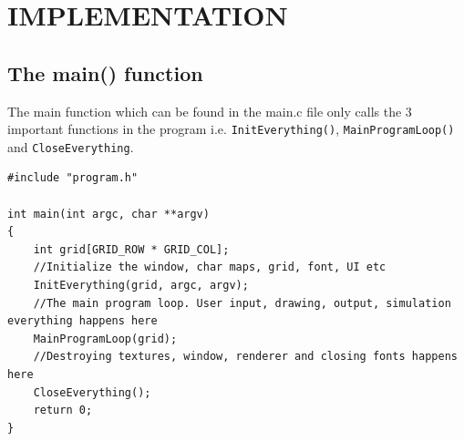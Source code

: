 \documentclass[report]{subfiles}
\begin{document}
    \chapter{IMPLEMENTATION}
    \section {The main() function}
    The main function which can be found in the main.c file only calls the 3 important functions in the program i.e. \texttt{InitEverything()}, \texttt{MainProgramLoop()} and \texttt{CloseEverything}.
    \begin{lstlisting}
#include "program.h"

int main(int argc, char **argv)
{
    int grid[GRID_ROW * GRID_COL];
    //Initialize the window, char maps, grid, font, UI etc
    InitEverything(grid, argc, argv);
    //The main program loop. User input, drawing, output, simulation everything happens here
    MainProgramLoop(grid);
    //Destroying textures, window, renderer and closing fonts happens here
    CloseEverything();
    return 0;
}
    \end{lstlisting}
\end{document}
